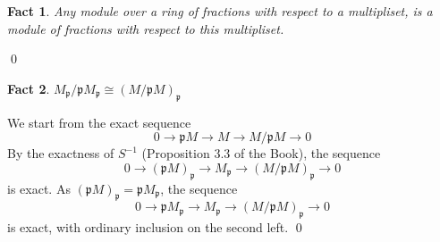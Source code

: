 \documentclass{article}
\newcommand{\mf}{\mathfrak}
\newcommand{\ppp}{\mf p}
\newtheorem{theorem}{Fact}[section]
\begin{document}
\begin{theorem}
Any module over a ring of fractions with respect to a multipliset, is a module of fractions with respect to this multipliset. 
\end{theorem}
\qed

\begin{theorem}
$M_\ppp/\ppp M_\ppp \cong (M/\ppp M)_\ppp$
\end{theorem}
We start from the exact sequence
\[
0 \rightarrow \ppp M \rightarrow M \rightarrow M/ \ppp M \rightarrow 0
\]
By the exactness of $S^{-1}$ (Proposition 3.3 of the Book), the sequence
\[
0 \rightarrow (\ppp M)_\ppp \rightarrow M_\ppp \rightarrow (M/\ppp M)_\ppp \rightarrow 0
\]
is exact. As $(\ppp M)_\ppp = \ppp M_\ppp$, the sequence
\[
0 \rightarrow \ppp M_\ppp \rightarrow M_\ppp \rightarrow (M/\ppp M)_\ppp \rightarrow 0
\]
is exact, with ordinary inclusion on the second left.
\qed

\vspace{8mm}
\end{document}
